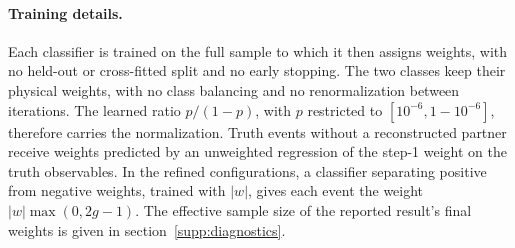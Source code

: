 \paragraph{Training details.} Each classifier is trained on the full sample to which it then assigns weights, with no held-out or cross-fitted split and no early stopping. The two classes keep their physical weights, with no class balancing and no renormalization between iterations. The learned ratio $p/(1-p)$, with $p$ restricted to $[10^{-6},1-10^{-6}]$, therefore carries the normalization. Truth events without a reconstructed partner receive weights predicted by an unweighted regression of the step-1 weight on the truth observables. In the refined configurations, a classifier separating positive from negative weights, trained with $|w|$, gives each event the weight $|w|\max(0,2g-1)$. The effective sample size of the reported result's final weights is given in section~\ref{supp:diagnostics}.

\label{sec:method-config}
